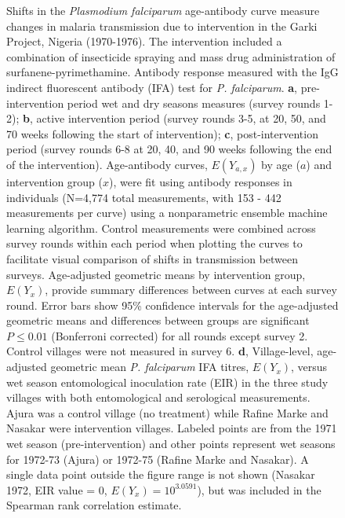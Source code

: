 \documentclass[11pt]{article}
\begin{document}
\begin{figure}[htbp]
\begin{center}
\begin{minipage}{\textwidth}
\caption{Shifts in the \textit{Plasmodium falciparum} age-antibody curve measure changes in malaria transmission due to intervention in the Garki Project, Nigeria (1970-1976). The intervention included a combination of insecticide spraying and mass drug administration of surfanene-pyrimethamine. Antibody response measured with the IgG indirect fluorescent antibody (IFA) test for \textit{P. falciparum}. \textbf{a}, pre-intervention period wet and dry seasons measures (survey rounds 1-2); \textbf{b}, active intervention period (survey rounds 3-5, at 20, 50, and 70 weeks following the start of intervention); \textbf{c}, post-intervention period (survey rounds 6-8 at 20, 40, and 90 weeks following the end of the intervention).  Age-antibody curves, $E(Y_{a,x})$ by age ($a$) and intervention group ($x$), were fit using antibody responses in individuals (N=4,774 total measurements, with 153 - 442 measurements per curve) using a nonparametric ensemble machine learning algorithm. Control measurements were combined across survey rounds within each period when plotting the curves to facilitate visual comparison of shifts in transmission between surveys. Age-adjusted geometric means by intervention group, $E(Y_x)$, provide summary differences between curves at each survey round. Error bars show 95\% confidence intervals for the age-adjusted geometric means and differences between groups are significant $P\leq0.01$ (Bonferroni corrected) for all rounds except survey 2. Control villages were not measured in survey 6. \textbf{d}, Village-level, age-adjusted geometric mean \textit{P. falciparum} IFA titres, $E(Y_x)$, versus wet season entomological inoculation rate (EIR) in the three study villages with both entomological and serological measurements. Ajura was a control village (no treatment) while Rafine Marke and Nasakar were intervention villages.  Labeled points are from the 1971 wet season (pre-intervention) and other points represent wet seasons for 1972-73 (Ajura) or 1972-75 (Rafine Marke and Nasakar). A single data point outside the figure range is not shown (Nasakar 1972, EIR value = 0, $E(Y_x) = 10^{3.0591}$), but was included in the Spearman rank correlation estimate.  }
\label{fig:garki}
\end{minipage}
\end{center}
\end{figure}
\end{document}
